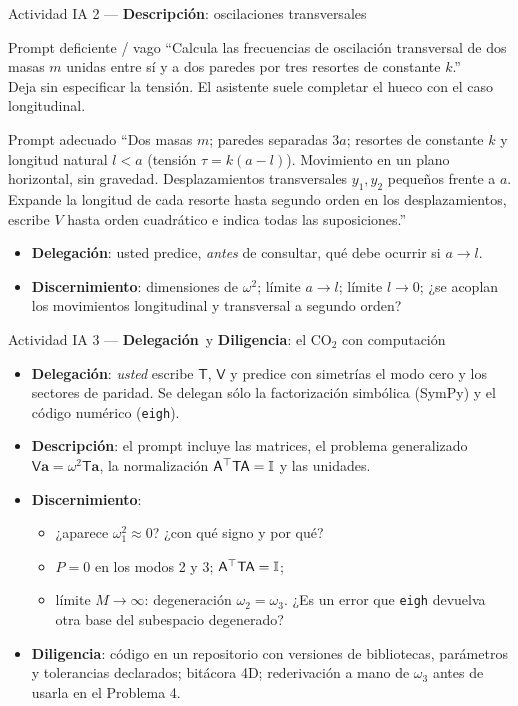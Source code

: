 \documentclass[spanish,10pt]{beamer}
\newcommand{\Tm}{\mathsf{T}}                 %
\newcommand{\Vm}{\mathsf{V}}                 %
\newcommand{\Am}{\mathsf{A}}                 %
\newcommand{\tr}{^{\top}}                    %
\newcommand{\Dele}{\textcolor{cdele}{\textbf{Delegación}}}
\newcommand{\Desc}{\textcolor{cdesc}{\textbf{Descripción}}}
\newcommand{\Disc}{\textcolor{cdisc}{\textbf{Discernimiento}}}
\newcommand{\Dili}{\textcolor{cdili}{\textbf{Diligencia}}}
\begin{document}
\begin{frame}{Actividad IA 2 — \Desc: oscilaciones transversales}
\begin{alertblock}{Prompt deficiente / vago}
\small “Calcula las frecuencias de oscilación transversal de dos masas $m$ unidas entre sí y a dos paredes por tres resortes de constante $k$.”\\
Deja sin especificar la tensión. El asistente suele completar el hueco con el caso longitudinal.
\end{alertblock}
\begin{exampleblock}{Prompt adecuado}
\small “Dos masas $m$; paredes separadas $3a$; resortes de constante $k$ y longitud natural $l<a$ (tensión $\tau=k(a-l)$). Movimiento en un plano horizontal, sin gravedad. Desplazamientos transversales $y_1,y_2$ pequeños frente a $a$. Expande la longitud de cada resorte hasta segundo orden en los desplazamientos, escribe $V$ hasta orden cuadrático e indica todas las suposiciones.”
\end{exampleblock}
\begin{itemize}
  \item \Dele: usted predice, \emph{antes} de consultar, qué debe ocurrir si $a\to l$.
  \item \Disc: dimensiones de $\omega^2$; límite $a\to l$; límite $l\to0$; ¿se acoplan los movimientos longitudinal y transversal a segundo orden?
\end{itemize}
\end{frame}

\begin{frame}{Actividad IA 3 — \Dele\ y \Dili: el CO$_2$ con computación}
\begin{itemize}
  \item \Dele: \emph{usted} escribe $\Tm$, $\Vm$ y predice con simetrías el modo cero y los sectores de paridad. Se delegan sólo la factorización simbólica (SymPy) y el código numérico (\texttt{eigh}).
  \item \Desc: el prompt incluye las matrices, el problema generalizado $\Vm\mathbf a=\omega^2\Tm\mathbf a$, la normalización $\Am\tr\Tm\Am=\Id$ y las unidades.
  \item \Disc:
  \begin{itemize}
    \item ¿aparece $\omega_1^2\approx0$? ¿con qué signo y por qué?
    \item $P=0$ en los modos 2 y 3; $\Am\tr\Tm\Am=\Id$;
    \item límite $M\to\infty$: degeneración $\omega_2=\omega_3$. ¿Es un error que \texttt{eigh} devuelva otra base del subespacio degenerado?
  \end{itemize}
  \item \Dili: código en un repositorio con versiones de bibliotecas, parámetros y tolerancias declarados; bitácora 4D; rederivación a mano de $\omega_3$ antes de usarla en el Problema 4.
\end{itemize}
\end{frame}
\end{document}

